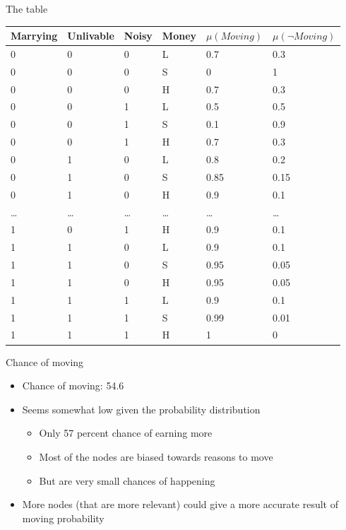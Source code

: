 \documentclass{beamer}
\begin{document}
\begin{frame}{The table}
\begin{centering}
\small
\begin{table}
\begin{tabular}{|llll|ll|}
  \hline
  Marrying & Unlivable & Noisy & Money &  $\mu(Moving)$ & $\mu(\neg Moving)$   \\ \hline
  0 & 0 & 0 & L & 0.7 & 0.3 \\
  0 & 0 & 0 & S & 0 & 1 \\
  0 & 0 & 0 & H & 0.7& 0.3   \\
  0 & 0 & 1 & L & 0.5  & 0.5  \\ 
  0 & 0 & 1 & S & 0.1  & 0.9  \\ 
  0 & 0 & 1 & H & 0.7  & 0.3   \\ 
  0 & 1 & 0 & L & 0.8  & 0.2  \\ 
  0 & 1 & 0 & S & 0.85  & 0.15  \\ 
  0 & 1 & 0 & H & 0.9  &  0.1  \\ 
  \dots  &\dots   &\dots   &\dots   & \dots     &\dots \\
  1 & 0 & 1 & H & 0.9  & 0.1  \\ 
  1 & 1 & 0 & L & 0.9  & 0.1  \\ 
  1 & 1 & 0 & S & 0.95  & 0.05   \\ 
  1 & 1 & 0 & H & 0.95  & 0.05  \\ 
  1 & 1 & 1 & L & 0.9  & 0.1  \\ 
  1 & 1 & 1 & S & 0.99  & 0.01  \\ 
  1 & 1 & 1 & H & 1  & 0   \\ 
  \hline
\end{tabular}
\end{table}
\end{centering}
\end{frame}


\begin{frame}{Chance of moving}
    \begin{itemize}
        \item Chance of moving: 54.6\\
        \item Seems somewhat low given the probability distribution
                    \begin{itemize}
                    \item Only 57 percent chance of earning more
                    \item Most of the nodes are biased towards reasons to move
                    \item But are very small chances of happening

                    \end{itemize}
                \item More nodes (that are more relevant) could give a more accurate result of moving
            probability
    \end{itemize}
\end{frame}
\end{document}
